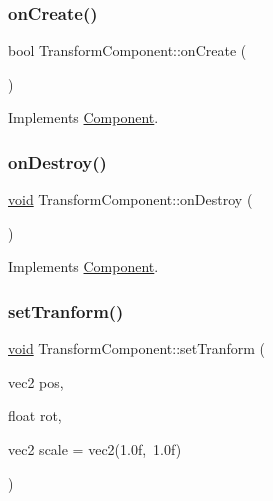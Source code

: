 \mbox{\label{classTransformComponent_aef9e192f10ac612d6b146136603b3293}} 
\subsubsection{\texorpdfstring{on\+Create()}{onCreate()}}
{\footnotesize\ttfamily bool Transform\+Component\+::on\+Create (\begin{DoxyParamCaption}{ }\end{DoxyParamCaption})\hspace{0.3cm}{\ttfamily [virtual]}}



Implements \hyperlink{classComponent_a3a1537a8b8bcdb2155afbb925c77b0a2}{Component}.

\mbox{\label{classTransformComponent_aab0dd130a6c8d4d6f873f81e59e48ee0}} 
\subsubsection{\texorpdfstring{on\+Destroy()}{onDestroy()}}
{\footnotesize\ttfamily \hyperlink{imgui__impl__opengl3__loader_8h_ac668e7cffd9e2e9cfee428b9b2f34fa7}{void} Transform\+Component\+::on\+Destroy (\begin{DoxyParamCaption}{ }\end{DoxyParamCaption})\hspace{0.3cm}{\ttfamily [virtual]}}



Implements \hyperlink{classComponent_a2b198f27162a6caf63917e304295f892}{Component}.

\mbox{\label{classTransformComponent_a18884d130163e9dcea2af6081f14130a}} 
\subsubsection{\texorpdfstring{set\+Tranform()}{setTranform()}}
{\footnotesize\ttfamily \hyperlink{imgui__impl__opengl3__loader_8h_ac668e7cffd9e2e9cfee428b9b2f34fa7}{void} Transform\+Component\+::set\+Tranform (\begin{DoxyParamCaption}\item[{vec2}]{pos,  }\item[{float}]{rot,  }\item[{vec2}]{scale = {\ttfamily vec2(1.0f,~1.0f)} }\end{DoxyParamCaption})\hspace{0.3cm}{\ttfamily [inline]}}

